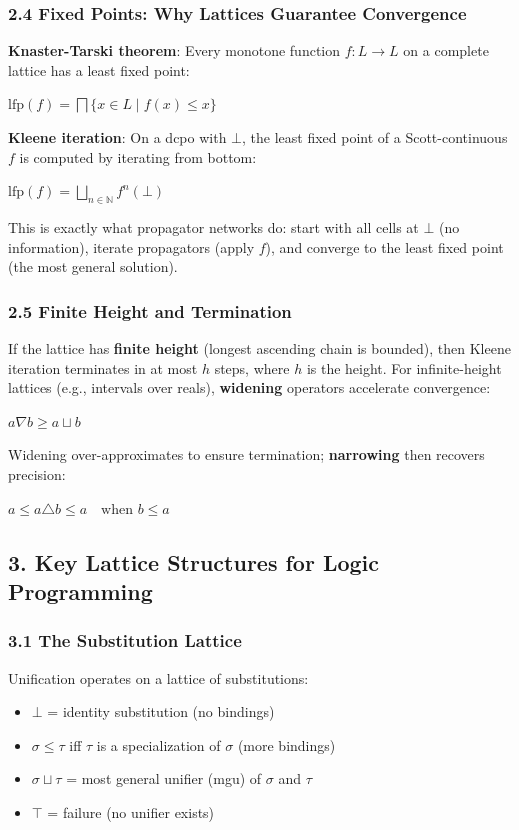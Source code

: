 \documentclass[11pt]{article}
\begin{document}
\subsubsection{2.4 Fixed Points: Why Lattices Guarantee Convergence}
\label{sec:org02eac93}

\textbf{Knaster-Tarski theorem}: Every monotone function \(f : L \to L\) on a
complete lattice has a least fixed point:

\(\mathrm{lfp}(f) = \bigsqcap \{ x \in L \mid f(x) \leq x \}\)

\textbf{Kleene iteration}: On a dcpo with \(\bot\), the least fixed point of a
Scott-continuous \(f\) is computed by iterating from bottom:

\(\mathrm{lfp}(f) = \bigsqcup_{n \in \mathbb{N}} f^n(\bot)\)

This is exactly what propagator networks do: start with all cells at \(\bot\)
(no information), iterate propagators (apply \(f\)), and converge to the
least fixed point (the most general solution).
\subsubsection{2.5 Finite Height and Termination}
\label{sec:orgb81fb20}

If the lattice has \textbf{finite height} (longest ascending chain is bounded),
then Kleene iteration terminates in at most \(h\) steps, where \(h\) is the
height. For infinite-height lattices (e.g., intervals over reals),
\textbf{widening} operators accelerate convergence:

\(a \nabla b \geq a \sqcup b\)

Widening over-approximates to ensure termination; \textbf{narrowing} then
recovers precision:

\(a \leq a \triangle b \leq a \quad \text{when } b \leq a\)
\subsection{3. Key Lattice Structures for Logic Programming}
\label{sec:orgf00992d}

\subsubsection{3.1 The Substitution Lattice}
\label{sec:org77cd5e3}

Unification operates on a lattice of substitutions:

\begin{itemize}
\item \(\bot\) = identity substitution (no bindings)
\item \(\sigma \leq \tau\) iff \(\tau\) is a specialization of \(\sigma\) (more bindings)
\item \(\sigma \sqcup \tau\) = most general unifier (mgu) of \(\sigma\) and \(\tau\)
\item \(\top\) = failure (no unifier exists)
\end{itemize}
\end{document}
